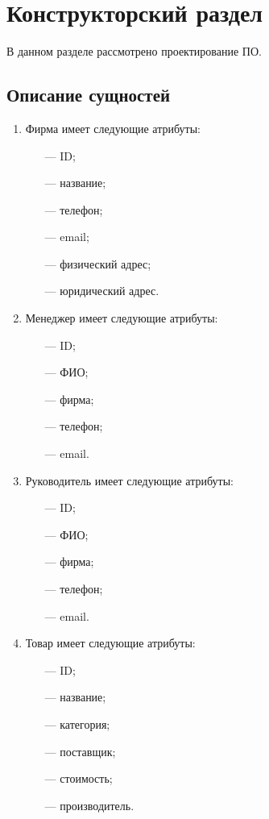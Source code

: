 \chapter{Конструкторский раздел}
В данном разделе рассмотрено проектирование ПО.

\section{Описание сущностей}
\begin{enumerate}
	\item Фирма имеет следующие атрибуты: 
	\begin{itemize}
		\item[---] ID;
		\item[---] название;
		\item[---] телефон;
		\item[---] email;
		\item[---] физический адрес;
		\item[---] юридический адрес.
	\end{itemize}
	
	\item Менеджер имеет следующие атрибуты: 
	\begin{itemize}
		\item[---] ID;
		\item[---] ФИО;
		\item[---] фирма;
		\item[---] телефон;
		\item[---] email.
	\end{itemize}
	
	\item Руководитель имеет следующие атрибуты: 
	\begin{itemize}
		\item[---] ID;
		\item[---] ФИО;
		\item[---] фирма;
		\item[---] телефон;
		\item[---] email.
	\end{itemize}
\newpage
	\item Товар имеет следующие атрибуты: 
	\begin{itemize}
		\item[---] ID;
		\item[---] название;
		\item[---] категория;
		\item[---] поставщик;
		\item[---] стоимость;
		\item[---] производитель.
	\end{itemize}
	

\end{enumerate}
